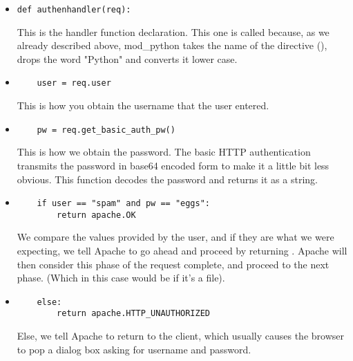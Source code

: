 \begin{itemize}

\item
\begin{verbatim}
def authenhandler(req):
\end{verbatim}

This is the handler function declaration. This one is called
 because, as we already described above, mod_python takes
the name of the directive (), drops the word
"Python" and converts it lower case.

\item
\begin{verbatim}
    user = req.user
\end{verbatim}
                  
This is how you obtain the username that the user entered. 

\item
\begin{verbatim}
    pw = req.get_basic_auth_pw()
\end{verbatim}
                  
This is how we obtain the password. The basic HTTP authentication
transmits the password in base64 encoded form to make it a little bit
less obvious. This function decodes the password and returns it as a
string.

\item
\begin{verbatim}
    if user == "spam" and pw == "eggs":
        return apache.OK
\end{verbatim}

We compare the values provided by the user, and if they are what we
were expecting, we tell Apache to go ahead and proceed by returning
. Apache will then consider this phase of the
request complete, and proceed to the next phase. (Which in this case
would be  if it's a  file).

\item
\begin{verbatim}
    else:
        return apache.HTTP_UNAUTHORIZED 
\end{verbatim}

Else, we tell Apache to return  to the
client, which usually causes the browser to pop a dialog box asking
for username and password.

\end{itemize}

